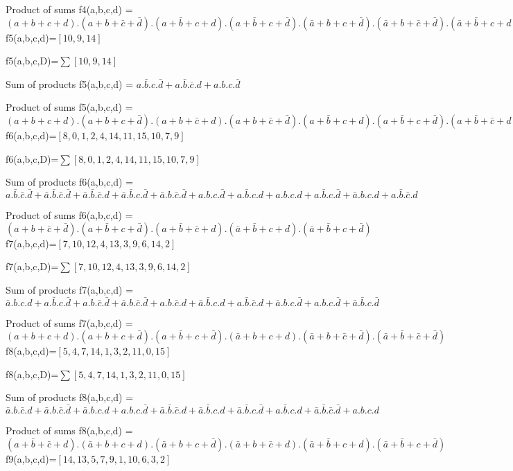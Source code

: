 Product of sums 
 f4(a,b,c,d) = $(a+b+c+d) . (a+b+\bar c+\bar d) . (a+\bar b+c+d) . (a+\bar b+c+\bar d) . (\bar a+b+c+\bar d) . (\bar a+b+\bar c+\bar d) . (\bar a+\bar b+c+d) . (\bar a+\bar b+c+\bar d) . (\bar a+\bar b+\bar c+\bar d)$
f5(a,b,c,d)=$[10, 9, 14]$

f5(a,b,c,D)=$ \sum [10, 9, 14] $ 


Sum of products 
 f5(a,b,c,d) = $a.\bar b.c.\bar d + a.\bar b.\bar c.d + a.b.c.\bar d$

Product of sums 
 f5(a,b,c,d) = $(a+b+c+d) . (a+b+c+\bar d) . (a+b+\bar c+d) . (a+b+\bar c+\bar d) . (a+\bar b+c+d) . (a+\bar b+c+\bar d) . (a+\bar b+\bar c+d) . (a+\bar b+\bar c+\bar d) . (\bar a+b+c+d) . (\bar a+b+\bar c+\bar d) . (\bar a+\bar b+c+d) . (\bar a+\bar b+c+\bar d) . (\bar a+\bar b+\bar c+\bar d)$
f6(a,b,c,d)=$[8, 0, 1, 2, 4, 14, 11, 15, 10, 7, 9]$

f6(a,b,c,D)=$ \sum [8, 0, 1, 2, 4, 14, 11, 15, 10, 7, 9] $ 


Sum of products 
 f6(a,b,c,d) = $a.\bar b.\bar c.\bar d + \bar a.\bar b.\bar c.\bar d + \bar a.\bar b.\bar c.d + \bar a.\bar b.c.\bar d + \bar a.b.\bar c.\bar d + a.b.c.\bar d + a.\bar b.c.d + a.b.c.d + a.\bar b.c.\bar d + \bar a.b.c.d + a.\bar b.\bar c.d$

Product of sums 
 f6(a,b,c,d) = $(a+b+\bar c+\bar d) . (a+\bar b+c+\bar d) . (a+\bar b+\bar c+d) . (\bar a+\bar b+c+d) . (\bar a+\bar b+c+\bar d)$
f7(a,b,c,d)=$[7, 10, 12, 4, 13, 3, 9, 6, 14, 2]$

f7(a,b,c,D)=$ \sum [7, 10, 12, 4, 13, 3, 9, 6, 14, 2] $ 


Sum of products 
 f7(a,b,c,d) = $\bar a.b.c.d + a.\bar b.c.\bar d + a.b.\bar c.\bar d + \bar a.b.\bar c.\bar d + a.b.\bar c.d + \bar a.\bar b.c.d + a.\bar b.\bar c.d + \bar a.b.c.\bar d + a.b.c.\bar d + \bar a.\bar b.c.\bar d$

Product of sums 
 f7(a,b,c,d) = $(a+b+c+d) . (a+b+c+\bar d) . (a+\bar b+c+\bar d) . (\bar a+b+c+d) . (\bar a+b+\bar c+\bar d) . (\bar a+\bar b+\bar c+\bar d)$
f8(a,b,c,d)=$[5, 4, 7, 14, 1, 3, 2, 11, 0, 15]$

f8(a,b,c,D)=$ \sum [5, 4, 7, 14, 1, 3, 2, 11, 0, 15] $ 


Sum of products 
 f8(a,b,c,d) = $\bar a.b.\bar c.d + \bar a.b.\bar c.\bar d + \bar a.b.c.d + a.b.c.\bar d + \bar a.\bar b.\bar c.d + \bar a.\bar b.c.d + \bar a.\bar b.c.\bar d + a.\bar b.c.d + \bar a.\bar b.\bar c.\bar d + a.b.c.d$

Product of sums 
 f8(a,b,c,d) = $(a+\bar b+\bar c+d) . (\bar a+b+c+d) . (\bar a+b+c+\bar d) . (\bar a+b+\bar c+d) . (\bar a+\bar b+c+d) . (\bar a+\bar b+c+\bar d)$
f9(a,b,c,d)=$[14, 13, 5, 7, 9, 1, 10, 6, 3, 2]$

